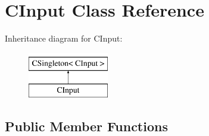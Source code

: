 \hypertarget{class_c_input}{
\section{CInput Class Reference}
\label{class_c_input}
}
Inheritance diagram for CInput:\begin{figure}[H]
\begin{center}
\leavevmode
\includegraphics[height=2cm]{class_c_input}
\end{center}
\end{figure}
\subsection*{Public Member Functions}
